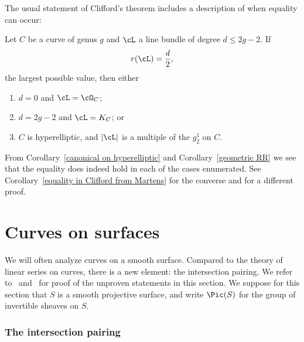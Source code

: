 The usual statement of Clifford's theorem includes a description of when equality can occur:

\begin{theorem}\label{Clifford}\label{Clifford equality}
Let $C$ be a curve of genus $g$ and $\cL$ a line bundle of degree $d \leq 2g-2$. If
$$
r(\cL) = \frac{d}{2},
$$
the largest possible value, then either
\begin{enumerate}
\item $d=0$ and $\cL = \cO_C$;
\item $d = 2g-2$ and $\cL = K_C$; or
\item $C$ is hyperelliptic, and $|\cL|$ is a multiple of the $g^1_2$ on $C$.
\end{enumerate}
\end{theorem}

From Corollary~\ref{canonical on hyperelliptic} and Corollary~\ref{geometric RR} we see that the equality does indeed hold
in each of the cases enumerated. See
Corollary~\ref{equality in Clifford from Martens} for the converse and \cite[IV.5.4]{Hartshorne1977}
for a different proof.

 \section{Curves on surfaces}\label{surface basics}
 
 We will often analyze curves  on a smooth surface. Compared to the theory of linear series on curves, there is a new element: the intersection pairing. We refer to~\cite[Chapter V]{Hartshorne1977}
 and~\cite[Chapter I]{Beauville} for proof of the unproven statements in this section.
 We suppose for this section that $S$ is a smooth projective surface,
 and write $\Pic(S)$ for the group of invertible sheaves on $S$.

\subsubsection{The intersection pairing}

